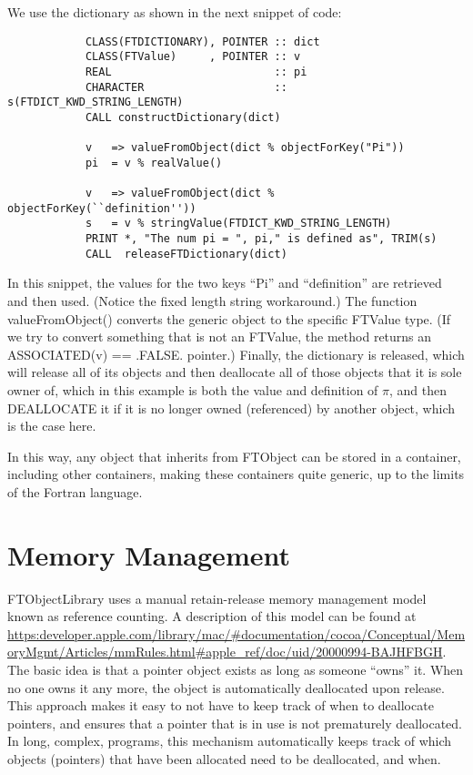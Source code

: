 \documentclass[9pt]{article}
\begin{document}
 We use the dictionary as shown in the next snippet of code:

{\color{blue}\begin{verbatim}
            CLASS(FTDICTIONARY), POINTER :: dict
            CLASS(FTValue)     , POINTER :: v
            REAL                         :: pi
            CHARACTER                    :: s(FTDICT_KWD_STRING_LENGTH)
            CALL constructDictionary(dict)
            
            v   => valueFromObject(dict % objectForKey("Pi"))
            pi  = v % realValue()
            
            v   => valueFromObject(dict % objectForKey(``definition''))
            s   = v % stringValue(FTDICT_KWD_STRING_LENGTH)
            PRINT *, "The num pi = ", pi," is defined as", TRIM(s)
            CALL  releaseFTDictionary(dict)
\end{verbatim}}
  
 In this snippet, the values for the two keys ``Pi'' and ``definition'' are retrieved and then used.
 (Notice the fixed length string workaround.)
 The function valueFromObject() converts the generic object to the specific FTValue type. (If we try to convert something that is not an FTValue, the method returns an ASSOCIATED(v) == .FALSE. pointer.) Finally, the dictionary is
 released, which will release all of its objects and then deallocate all of those objects that it is
 sole owner of, which in this example is both the value and definition of $\pi$, and then DEALLOCATE it
 if it is no longer owned (referenced) by another object, which is the case here.
 
 In this way, any object that inherits from FTObject can be stored in a container, including other containers, making these
 containers quite generic, up to the limits of the Fortran language.

 \section {Memory Management}
 FTObjectLibrary uses a manual retain-release memory management model known as reference counting. A description of 
 this model can be found at 
 \url{https:developer.apple.com/library/mac/#documentation/cocoa/Conceptual/MemoryMgmt/Articles/mmRules.html#apple_ref/doc/uid/20000994-BAJHFBGH}.
 The basic idea is that a pointer object exists as long as someone ``owns'' it. When no one owns it any more, the object is automatically deallocated upon release. This approach makes it easy to not have to keep track of when to deallocate
 pointers, and ensures that a pointer that is in use is not prematurely deallocated. In long, complex, programs, this mechanism automatically keeps track of which
 objects (pointers) that have been allocated need to be deallocated, and when.
   
\end{document}
